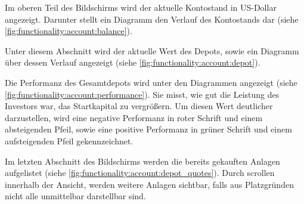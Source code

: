 \documentclass[a4paper]{article}
\begin{document}
Im oberen Teil des Bildschirms wird der aktuelle Kontostand in US-Dollar angezeigt.
Darunter stellt ein Diagramm den Verlauf des Kontostands dar (siehe \autoref{fig:functionality:account:balance}).

Unter diesem Abschnitt wird der aktuelle Wert des Depots, sowie ein Diagramm über dessen Verlauf angezeigt (siehe \autoref{fig:functionality:account:depot}).

Die Performanz des Gesamtdepots wird unter den Diagrammen angezeigt (siehe \autoref{fig:functionality:account:performance}).
Sie misst, wie gut die Leistung des Investors war, das Startkapital zu vergrößern.
Um diesen Wert deutlicher darzustellen, wird eine negative Performanz in roter Schrift und einem absteigenden Pfeil, sowie eine positive Performanz in grüner Schrift und einem aufsteigenden Pfeil gekennzeichnet.

Im letzten Abschnitt des Bildschirms werden die bereits gekauften Anlagen aufgelistet (siehe \autoref{fig:functionality:account:depot_quotes}).
Durch scrollen innerhalb der Ansicht, werden weitere Anlagen sichtbar, falls aus Platzgründen nicht alle unmittelbar darstellbar sind.
\end{document}
